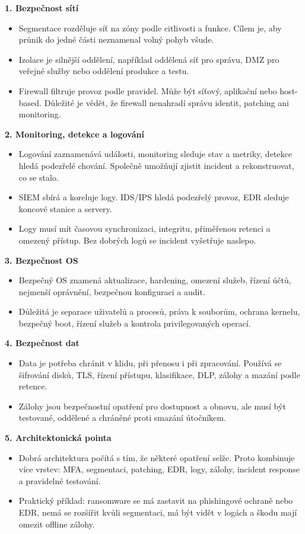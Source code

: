 \documentclass[11pt,a4paper]{article}
\begin{document}
\textbf{1. Bezpečnost sítí}
\begin{itemize}
  \item Segmentace rozděluje síť na zóny podle citlivosti a funkce. Cílem je, aby průnik do jedné části neznamenal volný pohyb všude.
  \item Izolace je silnější oddělení, například oddělená síť pro správu, DMZ pro veřejné služby nebo oddělení produkce a testu.
  \item Firewall filtruje provoz podle pravidel. Může být síťový, aplikační nebo host-based. Důležité je vědět, že firewall nenahradí správu identit, patching ani monitoring.
\end{itemize}

\textbf{2. Monitoring, detekce a logování}
\begin{itemize}
  \item Logování zaznamenává události, monitoring sleduje stav a metriky, detekce hledá podezřelé chování. Společně umožňují zjistit incident a rekonstruovat, co se stalo.
  \item SIEM sbírá a koreluje logy. IDS/IPS hledá podezřelý provoz, EDR sleduje koncové stanice a servery.
  \item Logy musí mít časovou synchronizaci, integritu, přiměřenou retenci a omezený přístup. Bez dobrých logů se incident vyšetřuje naslepo.
\end{itemize}

\textbf{3. Bezpečnost OS}
\begin{itemize}
  \item Bezpečný OS znamená aktualizace, hardening, omezení služeb, řízení účtů, nejmenší oprávnění, bezpečnou konfiguraci a audit.
  \item Důležitá je separace uživatelů a procesů, práva k souborům, ochrana kernelu, bezpečný boot, řízení služeb a kontrola privilegovaných operací.
\end{itemize}

\textbf{4. Bezpečnost dat}
\begin{itemize}
  \item Data je potřeba chránit v klidu, při přenosu i při zpracování. Používá se šifrování disků, TLS, řízení přístupu, klasifikace, DLP, zálohy a mazání podle retence.
  \item Zálohy jsou bezpečnostní opatření pro dostupnost a obnovu, ale musí být testované, oddělené a chráněné proti smazání útočníkem.
\end{itemize}

\textbf{5. Architektonická pointa}
\begin{itemize}
  \item Dobrá architektura počítá s tím, že některé opatření selže. Proto kombinuje více vrstev: MFA, segmentaci, patching, EDR, logy, zálohy, incident response a pravidelné testování.
  \item Praktický příklad: ransomware se má zastavit na phishingové ochraně nebo EDR, nemá se rozšířit kvůli segmentaci, má být vidět v logách a škodu mají omezit offline zálohy.
\end{itemize}
\end{document}
